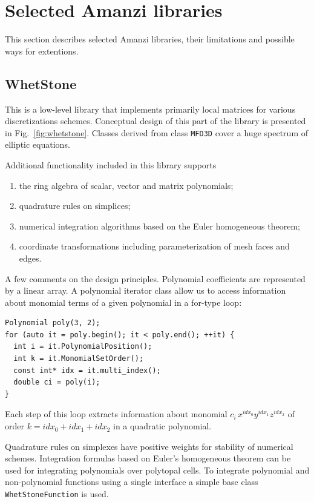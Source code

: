 
\section{Selected Amanzi libraries}

This section describes selected Amanzi libraries, their limitations and possible 
ways for extentions.

\subsection{WhetStone}
This is a low-level library that implements primarily local matrices for 
various discretizations schemes. 
Conceptual design of this part of the library is presented in Fig.~\ref{fig:whetstone}.
Classes derived from class {\tt MFD3D} cover a huge spectrum of elliptic
equations.

Additional functionality included in this library supports
\begin{enumerate}
\item the ring algebra of scalar, vector and matrix polynomials;
\item quadrature rules on simplices;
\item numerical integration algorithms based on the Euler homogeneous theorem;
\item coordinate transformations including parameterization of mesh faces and edges.
\end{enumerate}

A few  comments on the design principles. 
Polynomial coefficients are represented by a linear array. 
A polynomial iterator class allow us to access information about monomial terms of 
a given polynomial in a for-type loop:
\begin{lstlisting}
Polynomial poly(3, 2);
for (auto it = poly.begin(); it < poly.end(); ++it) {
  int i = it.PolynomialPosition();
  int k = it.MonomialSetOrder();
  const int* idx = it.multi_index();
  double ci = poly(i);
}
\end{lstlisting}
Each step of this loop extracts information about monomial $c_i \,x^{idx_0} y^{idx_1} z^{idx_2}$
of order $k= idx_0 + idx_1 + idx_2$ in a quadratic polynomial.

Quadrature rules on simplexes have positive weights for stability of numerical schemes. 
Integration formulas based on Euler's homogeneous theorem can be used for integrating
polynomials over polytopal cells.
To integrate polynomial and non-polynomial functions using a single interface a simple
base class {\tt WhetStoneFunction} is used.


